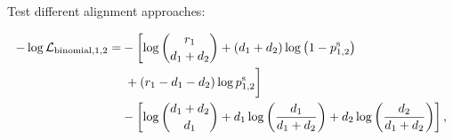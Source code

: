\documentclass{article}
\begin{document}
Test different alignment approaches:

{
\newcommand{\firstline}{\log\binom{r_1}{d_1+d_2} + (d_1+d_2) \log \left(1-p_{1,2}^\text{s}\right)}
\newcommand{\secondline}{+ (r_1-d_1-d_2) \log p_{1,2}^\text{s}}
\begin{align}
\begin{aligned}
-\log \mathcal{L}_{\text{binomial},1,2} =&-\left[\firstline\vphantom{\secondline}\right. \\
&\hspace*{\fill}\left.\vphantom{\firstline}\secondline\right] \\
&-\left[\log\binom{d_1+d_2}{d_1} + d_1 \log \left(\frac{d_1}{d_1+d_2}\right) + d_2 \log \left(\frac{d_2}{d_1+d_2}\right)\right],
\end{aligned}
\label{eq:test}
\end{align}
}
\end{document}
